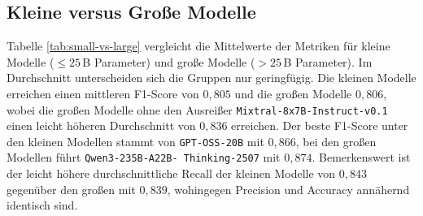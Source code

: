 \subsection*{Kleine versus Große Modelle}

Tabelle \ref{tab:small-vs-large} vergleicht die Mittelwerte der Metriken für kleine Modelle ($\leq 25$\,B Parameter) und große Modelle ($>25$\,B Parameter). Im Durchschnitt unterscheiden sich die Gruppen nur geringfügig. Die kleinen Modelle erreichen einen mittleren F1-Score von $0{,}805$ und die großen Modelle $0{,}806$, wobei die großen Modelle ohne den Ausreißer \texttt{Mixtral-8x7B-Instruct-v0.1} einen leicht höheren Durchschnitt von $0{,}836$ erreichen. Der beste F1-Score unter den kleinen Modellen stammt von \texttt{GPT-OSS-20B} mit $0{,}866$, bei den großen Modellen führt \texttt{Qwen3-235B-A22B-\linebreak~Thinking-2507} mit $0{,}874$. Bemerkenswert ist der leicht höhere durchschnittliche Recall der kleinen Modelle von $0{,}843$ gegenüber den großen mit $0{,}839$, wohingegen Precision und Accuracy annähernd identisch sind.

